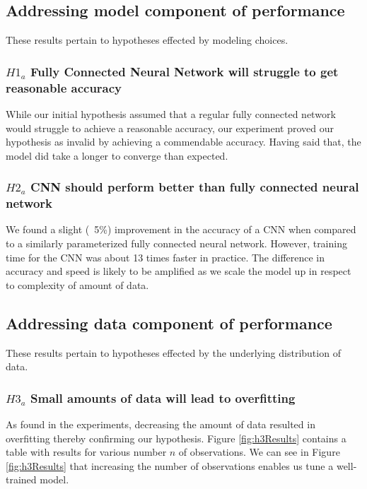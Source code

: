 \documentclass[11pt]{article}
\begin{document}
\subsection{Addressing model component of performance}

These results pertain to hypotheses effected by modeling choices.

\subsubsection{$H1_a$\: Fully Connected Neural Network will struggle to
  get reasonable accuracy}

While our initial hypothesis assumed that a regular fully connected
network would struggle to achieve a reasonable accuracy, our experiment
proved our hypothesis as invalid by achieving a commendable accuracy.
Having said that, the model did take a longer to converge than expected. 

\subsubsection{$H2_a$\: CNN should perform better than fully connected neural
  network}

We found a slight (~5\%) improvement in the accuracy of a CNN when compared
to a similarly parameterized fully connected neural network. However, training
time for the CNN was about 13 times faster in practice. The difference in
accuracy and speed is likely to be amplified as we scale the model up in
respect to complexity of amount of data.

\subsection{Addressing data component of performance}

These results pertain to hypotheses effected by the underlying
distribution of data.

\subsubsection{$H3_a$\: Small amounts of data will lead to overfitting}

As found in the experiments, decreasing the amount of data resulted
in overfitting thereby confirming our hypothesis. Figure \ref{fig:h3Results}
contains a table with results for various number $n$ of observations. We
can see in Figure \ref{fig:h3Results} that increasing the number of
observations enables us tune a well-trained model.
\end{document}
